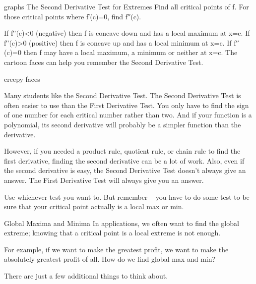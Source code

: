 graphs
The Second Derivative Test for Extremes
Find all critical points of f. For those critical points where f′(c)=0, find f′′(c).

If f′′(c)<0 (negative) then f is concave down and has a local maximum at x=c.
If f′′(c)>0 (positive) then f is concave up and has a local minimum at x=c.
If f′′(c)=0 then f may have a local maximum, a minimum or neither at x=c.
The cartoon faces can help you remember the Second Derivative Test.

creepy faces

Many students like the Second Derivative Test. The Second Derivative Test is often easier to use than the First Derivative Test. You only have to find the sign of one number for each critical number rather than two. And if your function is a polynomial, its second derivative will probably be a simpler function than the derivative.

However, if you needed a product rule, quotient rule, or chain rule to find the first derivative, finding the second derivative can be a lot of work. Also, even if the second derivative is easy, the Second Derivative Test doesn’t always give an answer. The First Derivative Test will always give you an answer.

Use whichever test you want to. But remember – you have to do some test to be sure that your critical point actually is a local max or min.

Global Maxima and Minima
In applications, we often want to find the global extreme; knowing that a critical point is a local extreme is not enough.

For example, if we want to make the greatest profit, we want to make the absolutely greatest profit of all. How do we find global max and min?

There are just a few additional things to think about.

